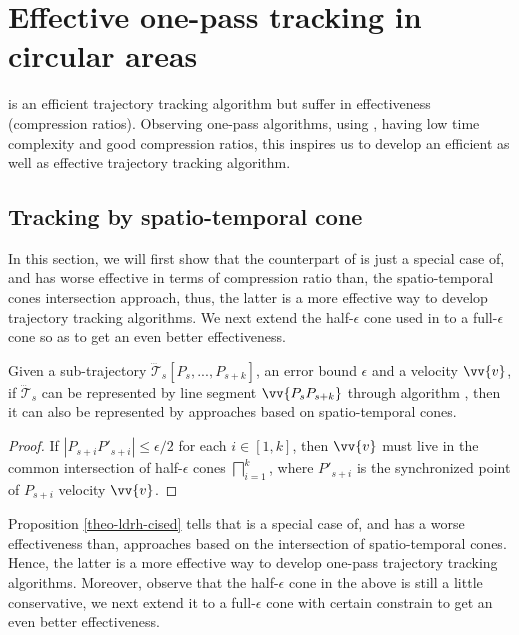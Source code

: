 \section{Effective one-pass tracking in circular areas}
\label{sec:circular}

\ldrh is an efficient trajectory tracking algorithm but suffer in effectiveness (compression ratios).
Observing one-pass algorithms, \cised using \sed, having low time complexity and good compression ratios, this inspires us to develop an efficient as well as effective trajectory tracking algorithm.

\subsection{Tracking by spatio-temporal cone}

In this section, we will first show that the counterpart of \ldrh is just a special case of, and has worse effective in terms of compression ratio than, the spatio-temporal cones intersection approach, thus, the latter is a more effective way to develop trajectory tracking algorithms. We next extend the half-$\epsilon$ cone used in \cised to a full-$\epsilon$ cone so as to get an even better effectiveness.

\begin{proposition}
\label{theo-ldrh-cised}
Given a sub-trajectory $\dddot{\mathcal{T}}_s[P_s,...,P_{s+k}]$, an error bound $\epsilon$ and a velocity $\vv{v}$, if $\dddot{\mathcal{T}}_s$ can be represented by line segment $\vv{P_sP_{s+k}}$ through algorithm \ldrh, then it can also be represented by approaches based on spatio-temporal cones.
\end{proposition}

\begin{proof}

If $|P_{s+i}P'_{s+i}|\le \epsilon/2$ for each $i \in [1,k]$, then $\vv{v}$ must live in the common intersection of half-$\epsilon$ cones $\bigsqcap_{i=1}^{k}$, where $P'_{s+i}$ is the synchronized point of $P_{s+i}$ \wrt velocity $\vv{v}$.
\end{proof}

Proposition \ref{theo-ldrh-cised} tells that \ldrh is a special case of, and has a worse effectiveness than, approaches based on the intersection of spatio-temporal cones. Hence, the latter is a more effective way to develop one-pass trajectory tracking algorithms. 
%
Moreover, observe that the half-$\epsilon$ cone in the above is still a little conservative, we next extend it to a full-$\epsilon$ cone with certain constrain to get an even better effectiveness.


